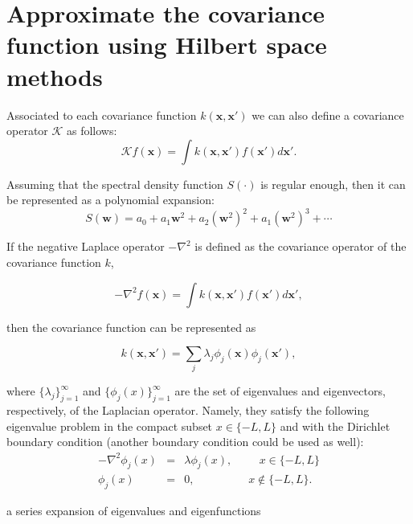 \documentclass[]{interact}
\theoremstyle{plain}%
\theoremstyle{definition}
\theoremstyle{remark}
\begin{document}
\section{Approximate the covariance function using Hilbert space methods}

Associated to each covariance function $k(\mathbf{x},\mathbf{x}')$ we can also define a covariance operator $\mathcal{K}$ as follows:
%
\begin{equation}
\mathcal{K} f(\mathbf{x}) = \int k(\mathbf{x},\mathbf{x}') f(\mathbf{x}') d\mathbf{x}'.
\end{equation} 

Assuming that the spectral density function $S(\cdot)$ is regular enough, then it can be represented as a polynomial expansion:
%
\begin{equation}
S(\mathbf{w})=a_0+a_1\mathbf{w}^2+a_2(\mathbf{w}^2)^2+a_1(\mathbf{w}^2)^3+\cdots
\end{equation}


If the negative Laplace operator $-\nabla^2$ is defined as the covariance operator of the covariance function $k$,

\begin{equation}
-\nabla^2 f(\mathbf{x}) = \int k(\mathbf{x},\mathbf{x}') f(\mathbf{x}') d\mathbf{x}',
\end{equation} 

\noindent then the covariance function can be represented as 

\begin{equation}
k(\mathbf{x},\mathbf{x}')= \sum_j \lambda_j \phi_j(\mathbf{x}) \phi_j(\mathbf{x}'),
\end{equation}

\noindent where $\{\lambda_j\}_{j=1}^{\infty}$ and $\{\phi_j(x)\}_{j=1}^{\infty}$ are the set of eigenvalues and eigenvectors, respectively, of the Laplacian operator. Namely, they satisfy the following eigenvalue problem in the compact subset $x \in \{-L,L\}$ and with the Dirichlet boundary condition (another boundary condition could be used as well):
%
\begin{eqnarray}
-\nabla^2 \phi_j(x)&=&\lambda \phi_j(x), \hspace{1cm}  x\in \{-L,L\} \nonumber \\ 
\phi_j(x)&=&0, \hspace{2cm} x\notin \{-L,L\}.
\end{eqnarray}  

a series expansion of eigenvalues and eigenfunctions 
\end{document}

